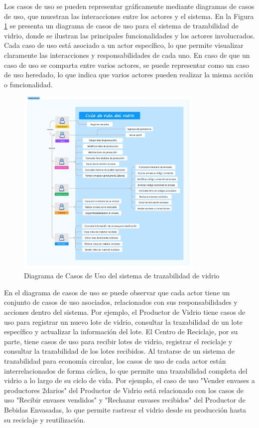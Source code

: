 Los casos de uso se pueden representar gráficamente mediante diagramas de casos de uso, que muestran las interacciones entre los actores y el sistema. En la Figura \ref{fig:use-case-diagram} se presenta un diagrama de casos de uso para el sistema de trazabilidad de vidrio, donde se ilustran las principales funcionalidades y los actores involucrados. Cada caso de uso está asociado a un actor específico, lo que permite visualizar claramente las interacciones y responsabilidades de cada uno. En caso de que un caso de uso se comparta entre varios actores, se puede representar como un caso de uso heredado, lo que indica que varios actores pueden realizar la misma acción o funcionalidad.

\begin{figure}[!htpb]
		\centering
		\includegraphics[width=0.8\textwidth]{Figures/use-case-diagram.png}
		\caption{Diagrama de Casos de Uso del sistema de trazabilidad de vidrio}
		\label{fig:use-case-diagram}
\end{figure}

En el diagrama de casos de uso se puede observar que cada actor tiene un conjunto de casos de uso asociados, relacionados con sus responsabilidades y acciones dentro del sistema. Por ejemplo, el Productor de Vidrio tiene casos de uso para registrar un nuevo lote de vidrio, consultar la trazabilidad de un lote específico y actualizar la información del lote. El Centro de Reciclaje, por su parte, tiene casos de uso para recibir lotes de vidrio, registrar el reciclaje y consultar la trazabilidad de los lotes recibidos. Al tratarse de un sistema de trazabilidad para economía circular, los casos de uso de cada actor están interrelacionados de forma cíclica, lo que permite una trazabilidad completa del vidrio a lo largo de su ciclo de vida. Por ejemplo, el caso de uso "Vender envases a productores 2darios" del Productor de Vidrio está relacionado con los casos de uso "Recibir envases vendidos" y "Rechazar envases recibidos" del Productor de Bebidas Envasadas, lo que permite rastrear el vidrio desde su producción hasta su reciclaje y reutilización.

